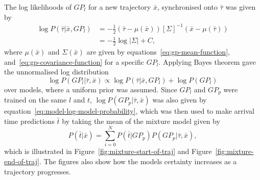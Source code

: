 The log likelihoods of $GP_l$ for a new trajectory $\bar{x}$,
synchronised onto $\bar{\tau}$ was given by
\begin{equation}
  \label{eq:model-log-likelihood}
  \begin{split}
    \log P(\bar{\tau}|\bar{x}, {GP_l}) & = -\frac{1}{2}(\bar{\tau} - \mu(\bar{x})){[\Sigma]}^{-1}(\bar{x} - \mu(\bar{\tau})) \\
    & = -\frac{1}{2}\log{|\Sigma|}+C,
  \end{split}
\end{equation}
where $\mu(\bar{x})$ and $\Sigma(\bar{x})$ are given by
equations~\ref{eq:gp-mean-function},
and~\ref{eq:gp-covariance-function} for a specific ${GP_l}$. Applying Bayes
theorem gave the unnormalised log distribution
\begin{equation}
  \label{eq:model-log-model-probability}
  \log P(GP_l | \bar{\tau}, \bar{x}) \propto \log P(\bar{\tau}|\bar{x}, GP_l) + \log P(GP_l)
\end{equation}
over models, where a uniform prior was assumed. Since
${GP_l}$ and $GP_p$ were trained on the same $l$ and $t$, 
$\log P(GP_p | \bar{\tau}, \bar{x})$ was also given by
equation~\ref{eq:model-log-model-probability}, which was then used to make 
arrival time predictions $\bar{t}$ by taking the mean of the mixture
model given by
\begin{equation}
  \label{eq:model-mixture}
  P(\bar{t}|\bar{x}) = \sum_{i=0}^{N}{P(\bar{t}|GP_p)P(GP_p | \bar{\tau},\bar{x})},
\end{equation}
which is illustrated in Figure~\ref{fig:mixture-start-of-traj} and
Figure~\ref{fig:mixture-end-of-traj}. The figures also show how the models certainty
increases as a trajectory progresses.
